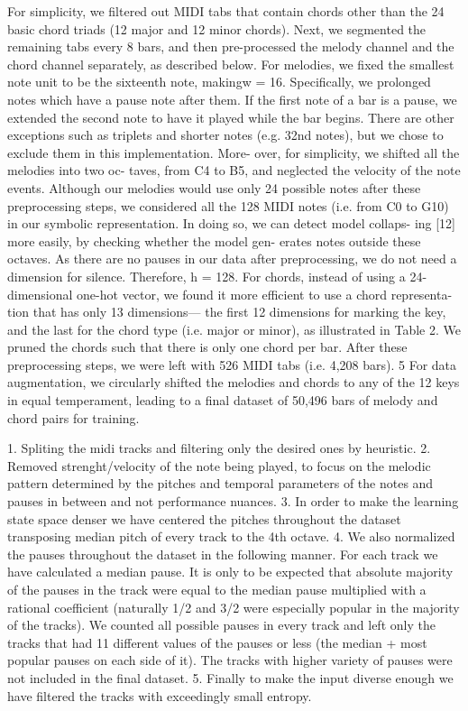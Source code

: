 \cite{Yang2017} 
For simplicity, we filtered out MIDI tabs that contain chords other than the 24 basic chord triads (12 major and 12 minor chords). Next, we segmented the remaining tabs every 8 bars, and then pre-processed the melody channel and the chord channel separately, as described below. For melodies, we fixed the smallest note unit to be the sixteenth note, makingw = 16. Specifically, we prolonged notes which have a pause note after them. If the first note of a bar is a pause, we extended the second note to have it played while the bar begins. There are other exceptions such as triplets and shorter notes (e.g. 32nd notes), but we chose to exclude them in this implementation. More- over, for simplicity, we shifted all the melodies into two oc- taves, from C4 to B5, and neglected the velocity of the note events. Although our melodies would use only 24 possible notes after these preprocessing steps, we considered all the 128 MIDI notes (i.e. from C0 to G10) in our symbolic representation. In doing so, we can detect model collaps- ing [12] more easily, by checking whether the model gen- erates notes outside these octaves. As there are no pauses in our data after preprocessing, we do not need a dimension for silence. Therefore, h = 128. For chords, instead of using a 24-dimensional one-hot vector, we found it more efficient to use a chord representa- tion that has only 13 dimensions— the first 12 dimensions for marking the key, and the last for the chord type (i.e. major or minor), as illustrated in Table 2. We pruned the chords such that there is only one chord per bar. After these preprocessing steps, we were left with 526 MIDI tabs (i.e. 4,208 bars). 5 For data augmentation, we circularly shifted the melodies and chords to any of the 12 keys in equal temperament, leading to a final dataset of 50,496 bars of melody and chord pairs for training.

\cite{Tikhonov2017}  1. Spliting the midi tracks and filtering only the desired ones by heuristic. 2. Removed strenght/velocity of the note being played, to focus on the melodic pattern determined by the pitches and temporal parameters of the notes and pauses in between and not performance nuances. 3. In order to make the learning state space denser we have centered the pitches throughout the dataset transposing median pitch of every track to the 4th octave. 4. We also normalized the pauses throughout the dataset in the following manner. For each track we have calculated a median pause. It is only to be expected that absolute majority of the pauses in the track were equal to the median pause multiplied with a rational coefficient (naturally 1/2 and 3/2 were especially popular in the majority of the tracks). We counted all possible pauses in every track and left only the tracks that had 11 different values of the pauses or less (the median + most popular pauses on each side of it). The tracks with higher variety of pauses were not included in the final dataset.
5. Finally to make the input diverse enough we have filtered the tracks with exceedingly small entropy.


